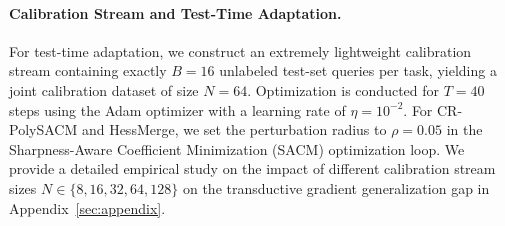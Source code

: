 \paragraph{Calibration Stream and Test-Time Adaptation.}
For test-time adaptation, we construct an extremely lightweight calibration stream containing exactly $B=16$ unlabeled test-set queries per task, yielding a joint calibration dataset of size $N=64$. Optimization is conducted for $T=40$ steps using the Adam optimizer with a learning rate of $\eta = 10^{-2}$. For CR-PolySACM and HessMerge, we set the perturbation radius to $\rho = 0.05$ in the Sharpness-Aware Coefficient Minimization (SACM) optimization loop. We provide a detailed empirical study on the impact of different calibration stream sizes $N \in \{8, 16, 32, 64, 128\}$ on the transductive gradient generalization gap in Appendix~\ref{sec:appendix}.

